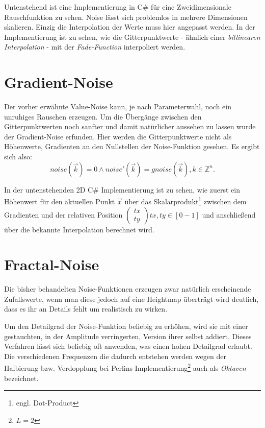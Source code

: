Untenstehend ist eine Implementierung in C\# für eine Zweidimensionale Rauschfunktion zu sehen.
Noise lässt sich problemlos in mehrere Dimensionen skalieren. Einzig die Interpolation der Werte muss hier angepasst werden. In der Implementierung ist zu sehen, wie die Gitterpunktwerte - ähnlich einer \emph{billinearen Interpolation} - mit der \emph{Fade-Function} interpoliert werden.

\label{valueNoise.cs}

\section{Gradient-Noise}\label{Gradient-Noise}
Der vorher erwähnte Value-Noise kann, je nach Parameterwahl, noch ein unruhiges Rauschen erzeugen. Um die Übergänge zwischen den Gitterpunktwerten noch sanfter und damit natürlicher aussehen zu lassen wurde der Gradient-Noise erfunden.
Hier werden die Gitterpunktwerte nicht als Höhenwerte, Gradienten an den Nullstellen der Noise-Funktion gesehen.
Es ergibt sich also:
\begin{equation}
noise(\vec{k}) = 0 \land 
noise'(\vec{k}) = gnoise(\vec{k}),  k \in \mathbb{Z}^n  .
\end{equation}

In der untenstehenden 2D C\# Implementierung ist zu sehen, wie zuerst ein Höhenwert für den aktuellen Punkt  $\vec{x}$ über das Skalarprodukt\footnote{engl. Dot-Product} zwischen dem Gradienten und der relativen Position $\begin{pmatrix}tx\\ty\end{pmatrix}  tx, ty\in [0-1]$ und anschließend über die bekannte Interpolation berechnet wird.


 

\section{Fractal-Noise}\label{Fractal-Noise}

Die bisher behandelten Noise-Funktionen erzeugen zwar natürlich erscheinende Zufallswerte, wenn man diese jedoch auf eine Heightmap überträgt wird deutlich, dass es ihr an Details fehlt um realistisch zu wirken.

Um den Detailgrad der Noise-Funktion beliebig zu erhöhen, wird sie mit einer gestauchten, in der Amplitude verringerten, Version ihrer selbst addiert. 
Dieses Verfahren lässt sich beliebig oft anwenden, was einen hohen Detailgrad erlaubt.
Die verschiedenen Frequenzen die dadurch entstehen werden wegen der Halbierung bzw. Verdopplung bei Perlins Implementierung\footnote{$L=2$} auch als \emph{Oktaven} bezeichnet.

